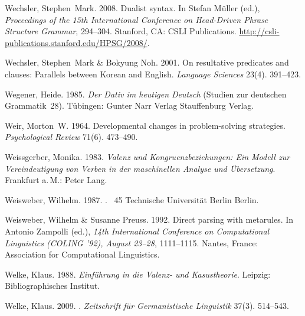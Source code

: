 \begin{thebibliography}{1420}
Wechsler, Stephen~Mark. 2008{}.
\newblock Dualist syntax.
\newblock In Stefan M{\"u}ller (ed.), \emph{Proceedings of the {15th
  International Conference on Head-Driven Phrase Structure Grammar}}, 294--304.
  Stanford, CA: CSLI Publications.
\newblock \urlprefix\url{http://csli-publications.stanford.edu/HPSG/2008/}.

Wechsler, Stephen~Mark \& Bokyung Noh. 2001.
\newblock On resultative predicates and clauses: Parallels between {Korean} and
  {English}.
\newblock \emph{Language Sciences} 23(4). 391--423.

Wegener, Heide. 1985.
\newblock \emph{{Der Dativ im heutigen Deutsch}} (Studien zur deutschen
  Grammatik~28).
\newblock T{\"u}bingen: \original Gunter Narr Verlag \jetzt Stauffenburg
  Verlag.

Weir, Morton~W. 1964.
\newblock Developmental changes in problem-solving strategies.
\newblock \emph{Psychological Review} 71(6). 473--490.

Weissgerber, Monika. 1983.
\newblock \emph{{Valenz und Kongruenzbeziehungen: Ein Modell zur
  Vereindeutigung von Verben in der maschinellen Analyse und {\"U}bersetzung}}.
\newblock Frankfurt a.\,M.: Peter Lang.

Weisweber, Wilhelm. 1987.
.
~45 Technische Universit{\"a}t Berlin Berlin.

Weisweber, Wilhelm \& Susanne Preuss. 1992.
\newblock Direct parsing with metarules.
\newblock In Antonio Zampolli (ed.), \emph{{14th International Conference on
  Computational Linguistics (COLING '92), August 23--28}}, 1111--1115. Nantes,
  France: Association for Computational Linguistics.

Welke, Klaus. 1988.
\newblock \emph{{Einf{\"u}hrung in die Valenz- und Kasustheorie}}.
\newblock Leipzig: Bibliographisches Institut.

Welke, Klaus. 2009.
.
\newblock \emph{Zeitschrift f{\"u}r Germanistische Linguistik} 37(3). 514--543.


\end{thebibliography}
